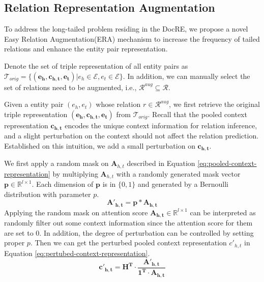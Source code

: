 \documentclass[11pt]{article}
\begin{document}
\subsection{Relation Representation Augmentation}
    \label{sec:era-relation-aug}
     To address the long-tailed problem residing in the DocRE, we propose a novel Easy Relation Augmentation(ERA) mechanism to increase the frequency of tailed relations and enhance the entity pair representation.
    


    Denote the set of triple representation of all entity pairs as $\mathcal{T}_{orig} = \{(\mathbf{e_h,c_{h,t},e_t}) |  e_h \in \mathcal{E}, e_t \in \mathcal{E}\}$. In addition, we can manually select the set of relations need to be augmented, i.e., $\mathcal{R}^{aug} \subseteq \mathcal{R}$. 
    
    Given a entity pair $(e_h,e_t)$ whose relation $r \in \mathcal{R}^{aug}$, we first retrieve the original triple representation $(\mathbf{e_h,c_{h,t},e_t})$ from $\mathcal{T}_{orig}$. Recall that the pooled context representation $\mathbf{c_{h,t}}$ encodes the unique context information for relation inference, and a slight perturbation on the context should not affect the relation prediction. Established on this intuition, we add a small perturbation on $\mathbf{c_{h,t}}$.
    
    We first apply a random mask on $\mathbf{A}_{h,t}$ described in Equation \ref{eq:pooled-context-representation} by multiplying $\mathbf{A}_{h,t}$ with a randomly generated mask vector $\mathbf{p} \in \mathbb{R}^{l\times 1}$. Each dimension of $\mathbf{p}$ is in $\{0,1\}$ and generated by a Bernoulli distribution with parameter $p$.
    \begin{equation}
        \mathbf{A'_{h,t}} = \mathbf{p} * \mathbf{A_{h,t}}
    \end{equation}
    Applying the random mask on attention score $\mathbf{A_{h,t}} \in \mathbb{R}^{l\times 1}$ can be interpreted as randomly filter out some context information since the attention score for them are set to $0$. In addition, the degree of perturbation can be controlled by setting proper $p$.
    Then we can get the perturbed pooled context representation $c'_{h,t}$ in Equation \ref{eq:pertubed-context-representation}.
    \begin{equation}
        \label{eq:pertubed-context-representation}
        \mathbf{c'_{h,t} = H^T \cdot \frac{A'_{h,t}}{1^T\cdot A_{h,t}}}
    \end{equation}
    
\end{document}
